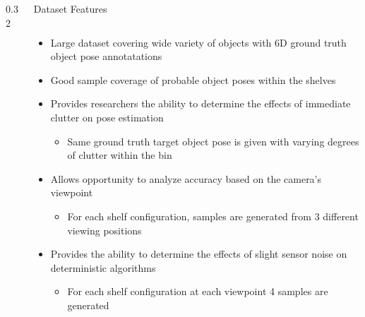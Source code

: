 \begin{columns}[t]
\begin{column} {0.32\textwidth}
	\end{column}
	\begin{column}{0.68\textwidth}
		\begin{block} {\large Dataset Features}
			\begin{columns}[T]
				\centering
				\begin{column}{0.59\textwidth}
					\begin{itemize}
						\item Large dataset covering wide variety of objects with 6D ground truth object pose annotatations
						\item Good sample coverage of probable object poses within the shelves
						\item Provides researchers the ability to determine the effects of immediate clutter on pose estimation
							\begin{itemize}
								\item Same ground truth target object pose is given with varying degrees of clutter within the bin
							\end{itemize}
						\item Allows opportunity to analyze accuracy based on the camera's viewpoint
							\begin{itemize}
								\item For each shelf configuration, samples are generated from 3 different viewing positions
							\end{itemize}
						\item Provides the ability to determine the effects of slight sensor noise on deterministic algorithms
							\begin{itemize}
								\item For each shelf configuration at each viewpoint 4 samples are generated
							\end{itemize}
					\end{itemize}
					

\end{column}
\end{columns}
\end{block}
\end{column}
\end{columns}
